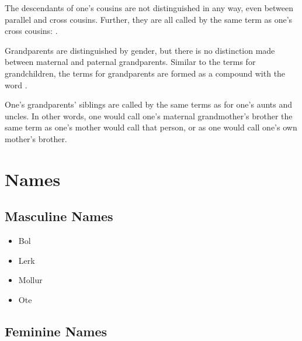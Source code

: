 The descendants of one's cousins are not distinguished in any way, even between parallel and cross cousins. Further, they are all called by the same term as one's cross cousins: .

Grandparents are distinguished by gender, but there is no distinction made between maternal and paternal grandparents. Similar to the terms for grandchildren, the terms for grandparents are formed as a compound with the word   .

\begin{description}[leftmargin=!,labelwidth=\widthof{\bfseries grandmother}]
	\item[grandmother]   
	\item[grandfather]   
	\item[grandparent]   
\end{description}

One's grandparents' siblings are called by the same terms as for one's aunts and uncles. In other words, one would call one's maternal grandmother's brother the same term as one's mother would call that person, or as one would call one's own mother's brother.


\section{Names}
\label{sec:tvk-names}

\subsection{Masculine Names}
\label{subsec:tvk-names-masc}

\begin{itemize}
	\item {} Bol 
	\item {} Lerk 
	\item {} Mollur 
	\item {} Ote 
\end{itemize}

\subsection{Feminine Names}
\label{subsec:tvk-names-femi}


